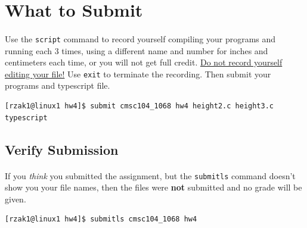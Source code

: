 \documentclass[letter,11pt]{article}
\begin{document}
\section*{What to Submit}
\paragraph{}Use the \texttt{script} command to record yourself compiling your programs and running each 3 times, using a different name and number for inches and centimeters each time, or you will not get full credit. \underline{Do not record yourself editing your file!} Use \texttt{exit} to terminate the recording. Then submit your programs and typescript file.
\begin{verbatim}
[rzak1@linux1 hw4]$ submit cmsc104_1068 hw4 height2.c height3.c typescript
\end{verbatim}

\subsection*{Verify Submission}
\paragraph{}If you \textit{think} you submitted the assignment, but the \texttt{submitls} command doesn't show you your file names, then the files were \textbf{not} submitted and no grade will be given.
\begin{verbatim}
[rzak1@linux1 hw4]$ submitls cmsc104_1068 hw4
\end{verbatim}
\end{document}
